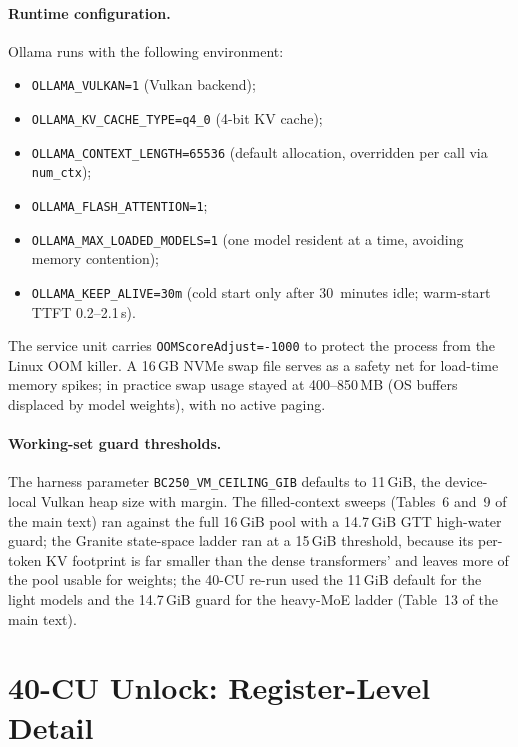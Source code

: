 \documentclass[11pt,a4paper]{article}
\begin{document}
\paragraph{Runtime configuration.}  Ollama runs with the following
environment:
\begin{itemize}[leftmargin=1.6em, itemsep=0.1ex, topsep=0.3ex]
\item \texttt{OLLAMA\_VULKAN=1} (Vulkan backend);
\item \texttt{OLLAMA\_KV\_CACHE\_TYPE=q4\_0} (4-bit KV cache);
\item \texttt{OLLAMA\_CONTEXT\_LENGTH=65536} (default allocation,
      overridden per call via \texttt{num\_ctx});
\item \texttt{OLLAMA\_FLASH\_ATTENTION=1};
\item \texttt{OLLAMA\_MAX\_LOADED\_MODELS=1} (one model resident at a
      time, avoiding memory contention);
\item \texttt{OLLAMA\_KEEP\_ALIVE=30m} (cold start only after
      30~minutes idle; warm-start TTFT 0.2--2.1\,s).
\end{itemize}
The service unit carries \texttt{OOMScoreAdjust=-1000} to protect the
process from the Linux OOM killer.  A 16\,GB NVMe swap file serves as
a safety net for load-time memory spikes; in practice swap usage
stayed at 400--850\,MB (OS buffers displaced by model weights), with
no active paging.

\paragraph{Working-set guard thresholds.}  The harness parameter
\texttt{BC250\_VM\_CEILING\_GIB} defaults to 11\,GiB, the device-local
Vulkan heap size with margin.  The filled-context sweeps (Tables~6
and~9 of the main text) ran against the full 16\,GiB pool with a
14.7\,GiB GTT high-water guard; the Granite state-space ladder ran at
a 15\,GiB threshold, because its per-token KV footprint is far smaller
than the dense transformers' and leaves more of the pool usable for
weights; the 40-CU re-run used the 11\,GiB default for the light
models and the 14.7\,GiB guard for the heavy-MoE ladder (Table~13 of
the main text).

\section{40-CU Unlock: Register-Level Detail}
\end{document}
